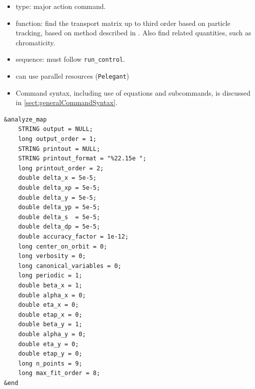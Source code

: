 \documentclass[11pt]{article}
\begin{document}
\begin{itemize}
\item type: major action command.
\item function: find the transport matrix up to third order based on particle tracking, based on method described
  in \cite{Borland_thesis}.
  Also find related quantities, such as chromaticity.
\item sequence: must follow \verb|run_control|.
\item can use parallel resources (\verb|Pelegant|)
\item Command syntax, including use of equations and subcommands, is discussed in \ref{sect:generalCommandSyntax}.
\end{itemize}

\begin{verbatim}
&analyze_map
    STRING output = NULL;
    long output_order = 1;
    STRING printout = NULL;
    STRING printout_format = "%22.15e ";
    long printout_order = 2;
    double delta_x = 5e-5;
    double delta_xp = 5e-5;
    double delta_y = 5e-5;
    double delta_yp = 5e-5;
    double delta_s  = 5e-5;
    double delta_dp = 5e-5;
    double accuracy_factor = 1e-12;
    long center_on_orbit = 0;
    long verbosity = 0;
    long canonical_variables = 0;
    long periodic = 1;
    double beta_x = 1;
    double alpha_x = 0;
    double eta_x = 0;
    double etap_x = 0;
    double beta_y = 1;
    double alpha_y = 0;
    double eta_y = 0;
    double etap_y = 0;
    long n_points = 9;
    long max_fit_order = 8;
&end
\end{verbatim}
\end{document}
